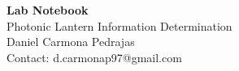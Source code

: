 \begin{titlepage}
    \begin{center}
    {\fontsize{40}{48}\selectfont \bfseries Lab Notebook}
    \\\vspace{20pt}
    {\LARGE Photonic Lantern Information Determination}
    \\\vspace{20pt}
    {\small Daniel Carmona Pedrajas \\
    Contact: d.carmonap97@gmail.com}
    \vspace{20pt}
    \textbf{}
    \vspace{8pt}
    \end{center}
    
\end{titlepage}